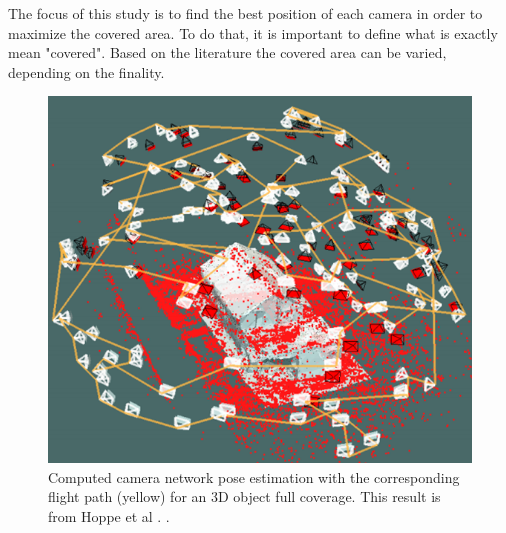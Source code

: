 The focus of this study is to find the best position of each camera in order to maximize the covered area. To do that, it is important to define what is exactly mean "covered". Based on the literature the covered area can be varied, depending on the finality. 
\begin{figure}[t!]
   \includegraphics[width=\linewidth]{img/objectCoverFrom142.png}
  \caption{ Computed camera network pose estimation with the corresponding flight path (yellow) for an 3D object full coverage. This result is from Hoppe et al \cite{142*hoppe2012}. 
.}\label{fig:ObjectCover142}
  \endminipage\hfill
\end{figure}

